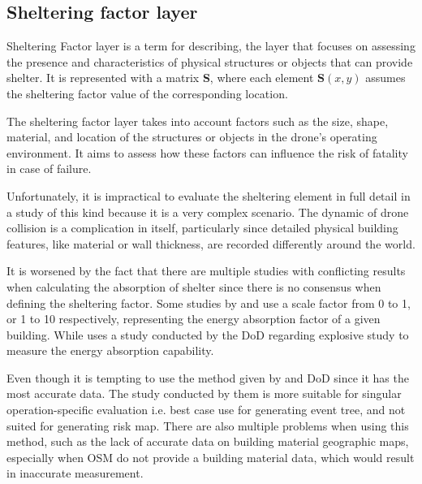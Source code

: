 \documentclass[12pt]{report}
\begin{document}
        \subsection{Sheltering factor layer}
            Sheltering Factor layer is a term for describing, the layer that focuses on assessing the presence and
            characteristics of physical structures or objects that can provide shelter. It is represented with a matrix
            \textbf{S}, where each element \(\mathbf{S}(x, y)\) assumes the sheltering factor value of the corresponding
            location.

            The sheltering factor layer takes into account factors such as the size, shape, material, and location of
            the structures or objects in the drone's operating environment. It aims to assess how these factors can
            influence the risk of fatality in case of failure.

            Unfortunately, it is impractical to evaluate the sheltering element in full detail in a study of this kind
            because it is a very complex scenario. The dynamic of drone collision is a complication in itself,
            particularly since detailed physical building features, like material or wall thickness, are recorded
            differently around the world.

            It is worsened by the fact that there are multiple studies with conflicting results when calculating the
            absorption of shelter since there is no consensus when defining the sheltering factor. Some studies by \cite{dalamagkidis_evaluating_2008}
            and \cite{primatesta_ground_2020} use a scale factor from 0 to 1, or 1 to 10 respectively, representing the energy absorption factor
            of a given building. While \cite{melnyk_third-party_2014} uses a study conducted by the \ac{DoD} \cite{harwick_approved_2007} regarding
            explosive study to measure the energy absorption capability.

            Even though it is tempting to use the method given by \cite{melnyk_third-party_2014} and DoD since it has the most accurate data. The
            study conducted by them is more suitable for singular operation-specific evaluation i.e. best case use for
            generating event tree, and not suited for generating risk map. There are also multiple problems when using
            this method, such as the lack of accurate data on building material geographic maps, especially when OSM do
            not provide a building material data, which would result in inaccurate measurement.
\end{document}
